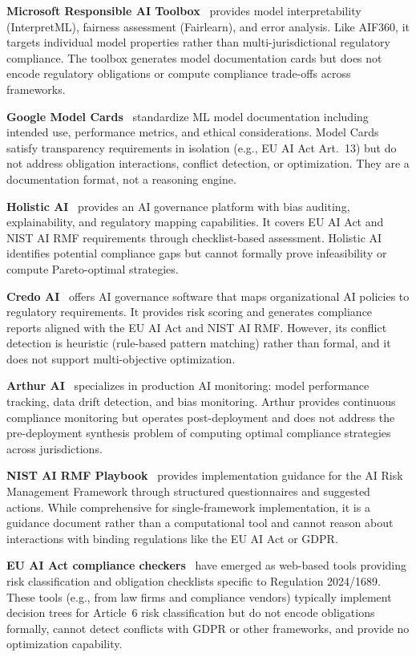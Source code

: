 \documentclass[11pt,twocolumn]{article}
\begin{document}
\textbf{Microsoft Responsible AI Toolbox}~\cite{msrai2023} provides model
interpretability (InterpretML), fairness assessment (Fairlearn), and error
analysis. Like AIF360, it targets individual model properties rather than
multi-jurisdictional regulatory compliance. The toolbox generates model
documentation cards but does not encode regulatory obligations or compute
compliance trade-offs across frameworks.

\textbf{Google Model Cards}~\cite{googlemodelcards} standardize ML model
documentation including intended use, performance metrics, and ethical
considerations. Model Cards satisfy transparency requirements in isolation
(e.g., EU AI Act Art.~13) but do not address obligation interactions, conflict
detection, or optimization. They are a documentation format, not a reasoning
engine.

\textbf{Holistic AI}~\cite{holisticai2024} provides an AI governance platform
with bias auditing, explainability, and regulatory mapping capabilities.
It covers EU AI Act and NIST AI RMF requirements through checklist-based
assessment. Holistic AI identifies potential compliance gaps but cannot formally
prove infeasibility or compute Pareto-optimal strategies.

\textbf{Credo AI}~\cite{credoai2024} offers AI governance software that maps
organizational AI policies to regulatory requirements. It provides risk scoring
and generates compliance reports aligned with the EU AI Act and NIST AI RMF.
However, its conflict detection is heuristic (rule-based pattern matching) rather
than formal, and it does not support multi-objective optimization.

\textbf{Arthur AI}~\cite{arthurai2024} specializes in production AI monitoring:
model performance tracking, data drift detection, and bias monitoring. Arthur
provides continuous compliance monitoring but operates post-deployment and does
not address the pre-deployment synthesis problem of computing optimal compliance
strategies across jurisdictions.

\textbf{NIST AI RMF Playbook}~\cite{nistrmfplaybook} provides implementation
guidance for the AI Risk Management Framework through structured questionnaires
and suggested actions. While comprehensive for single-framework implementation,
it is a guidance document rather than a computational tool and cannot reason
about interactions with binding regulations like the EU AI Act or GDPR.

\textbf{EU AI Act compliance checkers}~\cite{euaicheckers} have emerged as
web-based tools providing risk classification and obligation checklists specific
to Regulation 2024/1689. These tools (e.g., from law firms and compliance
vendors) typically implement decision trees for Article~6 risk classification but
do not encode obligations formally, cannot detect conflicts with GDPR or other
frameworks, and provide no optimization capability.
\end{document}
